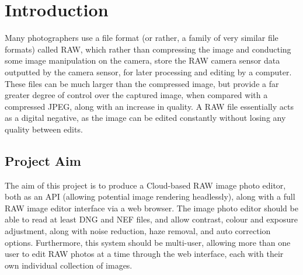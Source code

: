 \documentclass[12pt,a4paper]{article}
\begin{document}
\section{Introduction}

Many photographers use a file format (or rather, a family of very similar file formats) called RAW,
which rather than compressing the image and conducting some image manipulation on the camera,
store the RAW camera sensor data outputted by the camera sensor, for later processing and editing
by a computer. These files can be much larger than the compressed image, but provide a far greater
degree of control over the captured image, when compared with a compressed JPEG, along with an
increase in quality. A RAW file essentially acts as a digital negative, as the image can be edited
constantly without losing any quality between edits.  \cite{AllAboutTheFormat}





\subsection{Project Aim}
The aim of this project is to produce a Cloud-based RAW image photo editor, both as an API (allowing potential
image rendering headlessly), along with a full RAW image editor interface via a web browser. The image photo editor
should be able to read at least DNG and NEF files, and allow contrast, colour and exposure adjustment, along with
noise reduction, haze removal, and auto correction options. Furthermore, this system should be multi-user, allowing more than
one user to edit RAW photos at a time through the web interface, each with their own individual collection of images.
\end{document}
